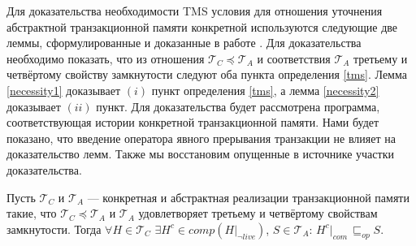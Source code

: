 Для доказательства необходимости TMS условия для отношения уточнения абстрактной транзакционной памяти конкретной используются следующие две леммы, сформулированные и доказанные в работе \cite{tms_article}. Для доказательства необходимо показать, что из отношения $\mathcal{T}_C \preceq \mathcal{T}_A$ и соответствия $\mathcal{T}_A$ третьему и четвёртому свойству замкнутости следуют оба пункта определения \ref{tms}. Лемма \ref{necessity1} доказывает $(i)$ пункт определения \ref{tms}, а лемма \ref{necessity2} доказывает $(ii)$ пункт. Для доказательства будет рассмотрена программа, соответствующая истории конкретной транзакционной памяти. Нами будет показано, что введение оператора явного прерывания транзакции не влияет на доказательство лемм. Также мы восстановим опущенные в источнике участки доказательства.     

\begin{lemma}\label{necessity1}
Пусть $\mathcal{T}_C$ и $\mathcal{T}_A$ --- конкретная и абстрактная реализации транзакционной памяти такие, что $\mathcal{T}_C \preceq \mathcal{T}_A$ и $\mathcal{T}_A$ удовлетворяет третьему и четвёртому свойствам замкнутости. Тогда $\forall H \in \mathcal{T}_C$ $\exists H^c \in comp(H |_{\neg live})$, $S \in \mathcal{T}_A$: $H^c|_{com} \, \sqsubseteq_{op} S$.
\end{lemma}
